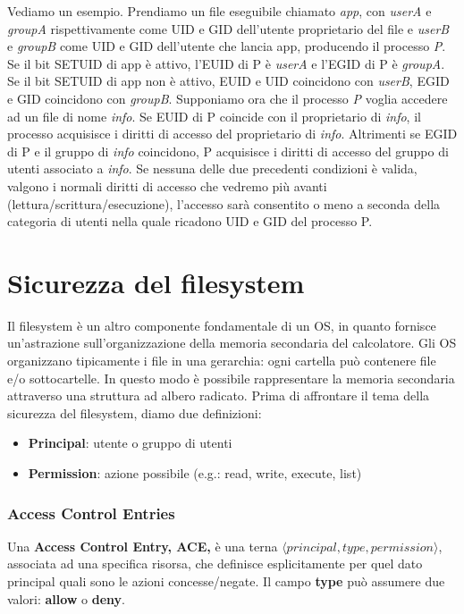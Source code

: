 Vediamo un esempio. Prendiamo un file eseguibile chiamato \textit{app}, con \textit{userA} e \textit{groupA} rispettivamente come UID e GID dell'utente proprietario del file e \textit{userB} e \textit{groupB} come UID e GID dell'utente che lancia app, producendo il processo \textit{P}. Se il bit SETUID di app è attivo, l'EUID di P è \textit{userA} e l'EGID di P è \textit{groupA}. Se il bit SETUID di app non è attivo, EUID e UID coincidono con \textit{userB}, EGID e GID coincidono con \textit{groupB}. Supponiamo ora che il processo \textit{P} voglia accedere ad un file di nome \textit{info}. Se EUID di P coincide con il proprietario di \textit{info}, il processo acquisisce i diritti di accesso del proprietario di \textit{info}. Altrimenti se EGID di P e il gruppo di \textit{info} coincidono, P acquisisce i diritti di accesso del gruppo di utenti associato a \textit{info}. Se nessuna delle due precedenti condizioni è valida, valgono i normali diritti di accesso che vedremo più avanti (lettura/scrittura/esecuzione), l'accesso sarà consentito o meno a seconda della categoria di utenti nella quale ricadono UID e GID del processo P.

\section{Sicurezza del filesystem}
Il filesystem è un altro componente fondamentale di un OS, in quanto fornisce un'astrazione sull'organizzazione della memoria secondaria del calcolatore. Gli OS organizzano tipicamente i file in una gerarchia: ogni cartella può contenere file e/o sottocartelle. In questo modo è possibile rappresentare la memoria secondaria attraverso una struttura ad albero radicato. Prima di affrontare il tema della sicurezza del filesystem, diamo due definizioni:
\begin{itemize}
  \item \textbf{Principal}: utente o gruppo di utenti
  \item \textbf{Permission}: azione possibile (e.g.: read, write, execute, list)
\end{itemize}

\subsubsection{Access Control Entries}
Una \textbf{Access Control Entry, ACE,} è una terna $\langle principal, type, permission \rangle$, associata ad una specifica risorsa, che definisce esplicitamente per quel dato principal quali sono le azioni concesse/negate. Il campo \textbf{type} può assumere due valori: \textbf{allow} o \textbf{deny}. \newline 

